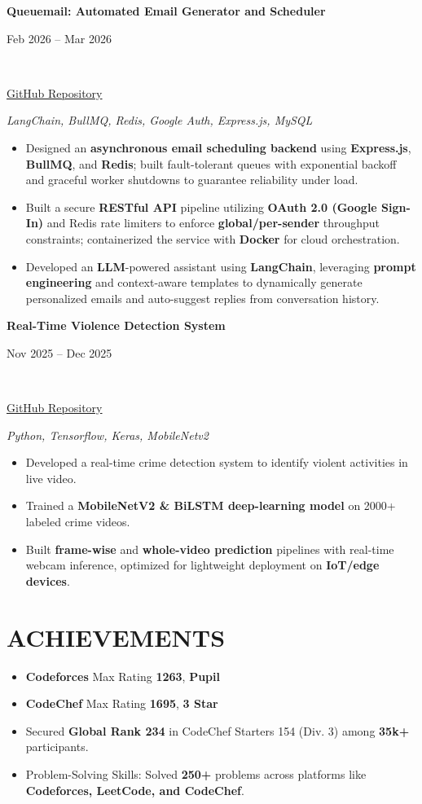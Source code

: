 \documentclass[letterpaper,9pt]{article}
\newcommand{\secgap}{\vspace{4pt}}
\newcommand{\headgap}{\vspace{2pt}}
\newcommand{\bulletgap}{\vspace{1pt}}
\newcommand{\entrygap}{\vspace{4pt}}
\newcommand{\resumeProject}[4]{
    \parbox[t]{0.68\textwidth}{\textbf{\small #1}}\hfill\parbox[t]{0.3\textwidth}{\raggedleft\small #2}\\
    \parbox[t]{0.68\textwidth}{\footnotesize #3}\hfill\parbox[t]{0.3\textwidth}{\raggedleft\textit{\footnotesize #4}}
}
\begin{document}
\entrygap
\resumeProject{Queuemail: Automated Email Generator and Scheduler}{Feb 2026 -- Mar 2026}
{\href{https://github.com/aman2225/automated_mail_scheduler}{\textcolor{linkcolor}{GitHub Repository}}}{\textit{LangChain, BullMQ, Redis, Google Auth, Express.js, MySQL}}
\headgap
\begin{itemize}
    \item \footnotesize Designed an \textbf{asynchronous email scheduling backend} using \textbf{Express.js}, \textbf{BullMQ}, and \textbf{Redis}; built fault-tolerant queues with exponential backoff and graceful worker shutdowns to guarantee reliability under load.
    \bulletgap
    \item \footnotesize Built a secure \textbf{RESTful API} pipeline utilizing \textbf{OAuth 2.0 (Google Sign-In)} and Redis rate limiters to enforce \textbf{global/per-sender} throughput constraints; containerized the service with \textbf{Docker} for cloud orchestration.
    \bulletgap
    \item \footnotesize Developed an \textbf{LLM}-powered assistant using \textbf{LangChain}, leveraging \textbf{prompt engineering} and context-aware templates to dynamically generate personalized emails and auto-suggest replies from conversation history.
\end{itemize}

\entrygap
\resumeProject{Real-Time Violence Detection System}{Nov 2025 -- Dec 2025}
{\href{https://github.com/aman2225/Real-Time-Violence-Detection}{\textcolor{linkcolor}{GitHub Repository}}}{\textit{Python, Tensorflow, Keras, MobileNetv2}}
\headgap
\begin{itemize}
    \item \footnotesize Developed a real-time crime detection system to identify violent activities in live video.
    \bulletgap
    \item \footnotesize Trained a \textbf{MobileNetV2 \& BiLSTM deep-learning model} on 2000+ labeled crime videos.
    \bulletgap
    \item \footnotesize Built \textbf{frame-wise} and \textbf{whole-video prediction} pipelines with real-time webcam inference, optimized for lightweight deployment on \textbf{IoT/edge devices}.
\end{itemize}

\secgap
\section{ACHIEVEMENTS}
\headgap
\begin{itemize}
    \item \footnotesize \textbf{Codeforces} Max Rating \textbf{1263}, \textbf{Pupil}
    \bulletgap
    \item \footnotesize \textbf{CodeChef} Max Rating \textbf{1695}, \textbf{3 Star}
    \bulletgap
    \item \footnotesize Secured \textbf{Global Rank 234} in CodeChef Starters 154 (Div. 3) among \textbf{35k+} participants.
    \bulletgap
    \item \footnotesize Problem-Solving Skills: Solved \textbf{250+} problems across platforms like \textbf{Codeforces, LeetCode, and CodeChef}.
\end{itemize}
\end{document}
